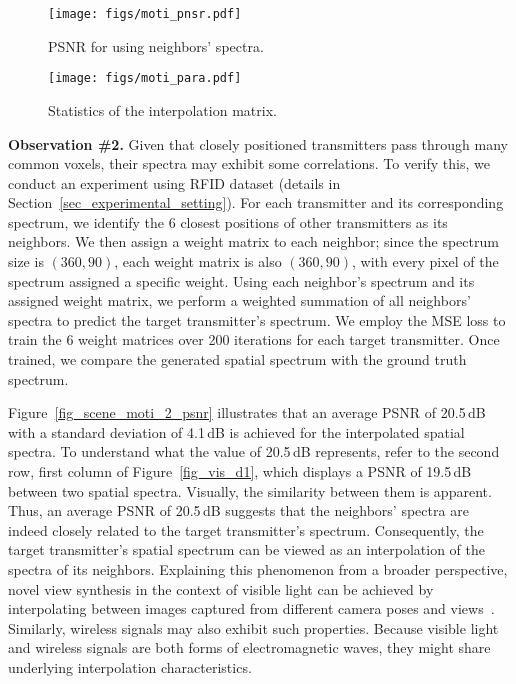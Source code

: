 \begin{figure}[t]
\centering
	\begin{minipage}[t]{0.35\linewidth} 
    	\texttt{[image: figs/moti\_pnsr.pdf]}
	\vspace{-0.3in}
            \caption{PSNR for using neighbors' spectra.}
        \label{fig_scene_moti_2_psnr}
	\end{minipage}
 \hspace{0.05in}
 	\begin{minipage}[t]{0.35\linewidth} 
    	\texttt{[image: figs/moti\_para.pdf]}
	\vspace{-0.3in}
        \caption{Statistics of the interpolation matrix.}
        \label{fig_scene_moti_2_para}
	\end{minipage}
 \vspace{10pt}
\end{figure}






\textbf{Observation \#2.}
Given that closely positioned transmitters pass through many common voxels, their spectra may exhibit some correlations.
To verify this, we conduct an experiment using RFID dataset (details in Section~\ref{sec_experimental_setting}).
For each transmitter and its corresponding spectrum, we identify the 6 closest positions of other transmitters as its neighbors.
We then assign a weight matrix to each neighbor; since the spectrum size is $(360, 90)$, each weight matrix is also $(360, 90)$, with every pixel of the spectrum assigned a specific weight.
Using each neighbor's spectrum and its assigned weight matrix, we perform a weighted summation of all neighbors' spectra to predict the target transmitter's spectrum.
We employ the MSE loss to train the 6 weight matrices over 200 iterations for each target transmitter.
Once trained, we compare the generated spatial spectrum with the ground truth spectrum.


Figure~\ref{fig_scene_moti_2_psnr} illustrates that an average PSNR of 20.5\,dB with a standard deviation of 4.1\,dB is achieved for the interpolated spatial spectra.
To understand what the value of 20.5\,dB represents, refer to the second row, first column of Figure~\ref{fig_vis_d1}, which displays a PSNR of 19.5\,dB between two spatial spectra.
Visually, the similarity between them is apparent.
Thus, an average PSNR of 20.5\,dB suggests that the neighbors' spectra are indeed closely related to the target transmitter's spectrum.
Consequently, the target transmitter's spatial spectrum can be viewed as an interpolation of the spectra of its neighbors.
Explaining this phenomenon from a broader perspective, novel view synthesis in the context of visible light can be achieved by interpolating between images captured from different camera poses and views~\cite{chen2023view}.
Similarly, wireless signals may also exhibit such properties.
Because visible light and wireless signals are both forms of electromagnetic waves, they might share underlying interpolation characteristics.


